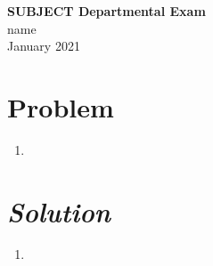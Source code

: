 \documentclass{article}
\begin{document}
\thispagestyle{empty}
\begin{center}\Large \textbf{SUBJECT Departmental Exam} \\
\normalsize name \\  January 2021
\end{center}

\section*{Problem } 
\begin{enumerate}[label=\alph*)]
	\item %
\end{enumerate}
\section*{\textit{Solution}} 
\begin{enumerate}[label=\alph*)]
	\item %
\end{enumerate}
\end{document}
